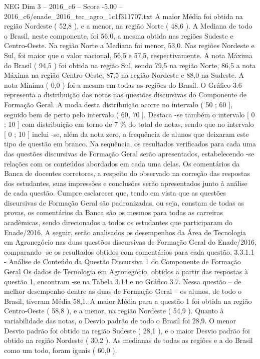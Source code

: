 \begin{textsample}{NEG Dim 3 – 2016\_c6 – Score -5.00 – 2016\_c6/enade\_2016\_tec\_agro\_1c1f311707.txt}
A maior Média foi obtida na região Nordeste ( 52,8 ), e a menor, na região Norte ( 48,6 ).
A Mediana de todo o Brasil, neste componente, foi 56,0, a mesma obtida nas regiões Sudeste e Centro-Oeste.
Na região Norte a Mediana foi menor, 53,0.
Nas regiões Nordeste e Sul, foi maior que o valor nacional, 56,5 e 57,5, respectivamente.
A nota Máxima do Brasil ( 94,5 ) foi obtida na região Sul, sendo 79,5 na região Norte, 86,5 a nota Máxima na região Centro-Oeste, 87,5 na região Nordeste e 88,0 na Sudeste.
A nota Mínima ( 0,0 ) foi a mesma em todas as regiões do Brasil.
O Gráfico 3.6 representa a distribuição das notas nas questões discursivas do Componente de Formação Geral.
A moda desta distribuição ocorre no intervalo ( 50 ; 60 ], seguido bem de perto pelo intervalo ( 60, 70 ].
Destaca -se também o intervalo [ 0 ; 10 ] com distribuição em torno de 7 \% do total de notas, sendo que no intervalo [ 0 ; 10 ] inclui -se, além da nota zero, a frequência de alunos que deixaram este tipo de questão em branco.
Na sequência, os resultados verificados para cada uma das questões discursivas de Formação Geral serão apresentados, estabelecendo -se relações com os conteúdos abordados em cada uma delas.
Os comentários da Banca de docentes corretores, a respeito do observado na correção das respostas dos estudantes, suas impressões e conclusões serão apresentados junto à análise de cada questão.
Cumpre esclarecer que, tendo em vista que as questões discursivas de Formação Geral são padronizadas, ou seja, constam de todas as provas, os comentários da Banca são os mesmos para todas as carreiras acadêmicas, sendo direcionados a todos os estudantes que participaram do Enade/2016.
A seguir, serão analisados os desempenhos da Área de Tecnologia em Agronegócio nas duas questões discursivas de Formação Geral do Enade/2016, comparando -se os resultados obtidos com comentários para cada questão. 3.3.1.1 - Análise de Conteúdo da Questão Discursiva 1 do Componente de Formação Geral Os dados de Tecnologia em Agronegócio, obtidos a partir das respostas à questão 1, encontram -se na Tabela 3.14 e no Gráfico 3.7.
Nessa questão – de melhor desempenho dentre as duas de Formação Geral – os alunos, de todo o Brasil, tiveram Média 58,1.
A maior Média para a questão 1 foi obtida na região Centro-Oeste ( 58,8 ), e a menor, na região Nordeste ( 54,9 ).
Quanto à variabilidade das notas, o Desvio padrão de todo o Brasil foi 28,9.
O menor Desvio padrão foi obtido na região Sudeste ( 28,1 ), e o maior Desvio padrão foi obtido na região Nordeste ( 30,2 ).
As medianas de todas as regiões e a do Brasil como um todo, foram iguais ( 60,0 ).

\end{textsample}

